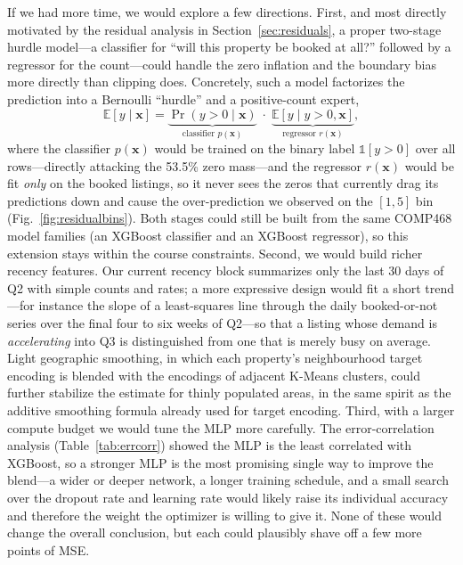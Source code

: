 \documentclass[journal]{IEEEtran}
\begin{document}
If we had more time, we would explore a few directions. First, and most directly
motivated by the residual analysis in Section~\ref{sec:residuals}, a proper
two-stage hurdle model---a classifier for ``will this property be booked at
all?'' followed by a regressor for the count---could handle the zero inflation
and the boundary bias more directly than clipping does. Concretely, such a model
factorizes the prediction into a Bernoulli ``hurdle'' and a positive-count
expert,
\begin{equation}
\mathbb{E}[y\mid\mathbf{x}] = \underbrace{\Pr(y>0\mid\mathbf{x})}_{\text{classifier }p(\mathbf{x})}\;\cdot\;\underbrace{\mathbb{E}[y\mid y>0,\mathbf{x}]}_{\text{regressor }r(\mathbf{x})},
\label{eq:hurdle}
\end{equation}
where the classifier $p(\mathbf{x})$ would be trained on the binary label
$\mathbb{1}[y>0]$ over all rows---directly attacking the 53.5\% zero
mass---and the regressor $r(\mathbf{x})$ would be fit \emph{only} on the booked
listings, so it never sees the zeros that currently drag its predictions down and
cause the over-prediction we observed on the $[1,5]$ bin
(Fig.~\ref{fig:residualbins}). Both stages could still be built from the same
COMP468 model families (an XGBoost classifier and an XGBoost regressor), so this
extension stays within the course constraints. Second, we would build
richer recency features. Our current recency block summarizes only the last 30
days of Q2 with simple counts and rates; a more expressive design would fit a
short trend---for instance the slope of a least-squares line through the daily
booked-or-not series over the final four to six weeks of Q2---so that a listing
whose demand is \emph{accelerating} into Q3 is distinguished from one that is
merely busy on average. Light geographic smoothing, in which each property's
neighbourhood target encoding is blended with the encodings of adjacent K-Means
clusters, could further stabilize the estimate for thinly populated areas, in the
same spirit as the additive smoothing formula already used for target encoding. Third, with a
larger compute budget we would tune the MLP more carefully. The error-correlation
analysis (Table~\ref{tab:errcorr}) showed the MLP is the least correlated with
XGBoost, so a stronger MLP is the most promising single way to improve the
blend---a wider or deeper network, a longer training schedule, and a small search
over the dropout rate and learning rate would likely raise its individual
accuracy and therefore the weight the optimizer is willing to give it. None of
these would change the overall conclusion, but each could plausibly shave off a
few more points of MSE.
\end{document}
